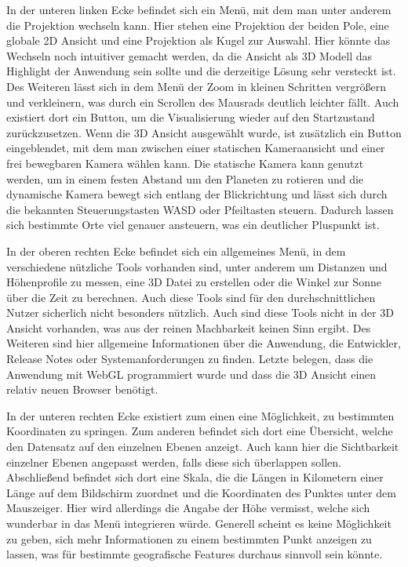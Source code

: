 In der unteren linken Ecke befindet sich ein Menü, mit dem man unter anderem die Projektion wechseln kann. Hier stehen eine Projektion der beiden Pole, eine globale 2D Ansicht und eine Projektion als Kugel zur Auswahl. Hier könnte das Wechseln noch intuitiver gemacht werden, da die Ansicht als 3D Modell das Highlight der Anwendung sein sollte und die derzeitige Lösung sehr versteckt ist. Des Weiteren lässt sich in dem Menü der Zoom in kleinen Schritten vergrößern und verkleinern, was durch ein Scrollen des Mausrads deutlich leichter fällt. Auch existiert dort ein Button, um die Visualisierung wieder auf den Startzustand zurückzusetzen. Wenn die 3D Ansicht ausgewählt wurde, ist zusätzlich ein Button eingeblendet, mit dem man zwischen einer statischen Kameraansicht und einer frei bewegbaren Kamera wählen kann. Die statische Kamera kann genutzt werden, um in einem festen Abstand um den Planeten zu rotieren und die dynamische Kamera bewegt sich entlang der Blickrichtung und lässt sich durch die bekannten Steuerungstasten WASD oder Pfeiltasten steuern. Dadurch lassen sich bestimmte Orte viel genauer ansteuern, was ein deutlicher Pluspunkt ist.

In der oberen rechten Ecke befindet sich ein allgemeines Menü, in dem verschiedene nützliche Tools vorhanden sind, unter anderem um Distanzen und Höhenprofile zu messen, eine 3D Datei zu erstellen oder die Winkel zur Sonne über die Zeit zu berechnen. Auch diese Tools sind für den durchschnittlichen Nutzer sicherlich nicht besonders nützlich. Auch sind diese Tools nicht in der 3D Ansicht vorhanden, was aus der reinen Machbarkeit keinen Sinn ergibt. Des Weiteren sind hier allgemeine Informationen über die Anwendung, die Entwickler, Release Notes oder Systemanforderungen zu finden. Letzte belegen, dass die Anwendung mit WebGL programmiert wurde und dass die 3D Ansicht einen relativ neuen Browser benötigt.

In der unteren rechten Ecke existiert zum einen eine Möglichkeit, zu bestimmten Koordinaten zu springen. Zum anderen befindet sich dort eine Übersicht, welche den Datensatz auf den einzelnen Ebenen anzeigt. Auch kann hier die Sichtbarkeit einzelner Ebenen angepasst werden, falls diese sich überlappen sollen. Abschließend befindet sich dort eine Skala, die die Längen in Kilometern einer Länge auf dem Bildschirm zuordnet und die Koordinaten des Punktes unter dem Mauszeiger. Hier wird allerdings die Angabe der Höhe vermisst, welche sich wunderbar in das Menü integrieren würde. Generell scheint es keine Möglichkeit zu geben, sich mehr Informationen zu einem bestimmten Punkt anzeigen zu lassen, was für bestimmte geografische Features durchaus sinnvoll sein könnte.

